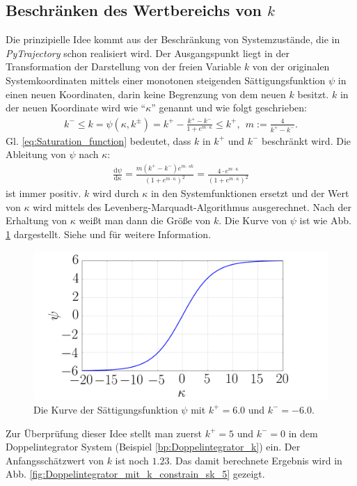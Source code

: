 \subsection{Beschränken des Wertbereichs von $k$}
\label{Beschränken_des_Wertbereichs_von_k}
Die prinzipielle Idee kommt aus der Beschränkung von Systemzustände, die in \emph{PyTrajectory} schon realisiert wird. Der Ausgangspunkt liegt in der Transformation der Darstellung von der freien Variable $k$ von der originalen Systemkoordinaten mittels einer monotonen steigenden Sättigungsfunktion $\psi$ in einen neuen Koordinaten, darin keine Begrenzung von dem neuen $k$ besitzt. $k$ in der neuen Koordinate wird wie ``$\kappa$'' genannt und wie folgt geschrieben:
\begin{eqnarray}
k^{-}\leq k = \psi (\kappa,k^{\pm}) = k^{+}- \frac{k^{+}-k^{-}}{1+e^{m\cdot \kappa}}\leq k^{+},~~m := \frac{4}{k^{+}-k^{-}}.
\label{eq:Saturation_function}
\end{eqnarray}
Gl. \eqref{eq:Saturation_function} bedeutet, dass $k$ in $k^{+}$ und $k^{-}$ beschränkt wird. Die Ableitung von $\psi$ nach $\kappa$:
\begin{eqnarray}
\frac{\mathrm{d} \psi}{\mathrm{d}\kappa} = \frac{m(k^{+}-k^{-})e^{m\cdot sk}}{(1+e^{m\cdot \kappa})^{2}} = \frac{4\cdot e^{m\cdot \kappa}}{(1+e^{m\cdot \kappa})^{2}}
\label{eq:Saturation_function_diff}
\end{eqnarray}
ist immer positiv. $k$ wird durch $\kappa$ in den Systemfunktionen ersetzt und der Wert von $\kappa$ wird mittels des Levenberg-Marquadt-Algorithmus ausgerechnet. Nach der Erhaltung von $\kappa$ weißt man dann die Größe von $k$. Die Kurve von $\psi$ ist wie Abb. \ref{fig:psi_plot} dargestellt. Siehe \cite{graichen2006inversionsbasierter} und \cite{kunze2016pytrajectory} für weitere Information.
\begin{figure}[!h]
	\centering
	\includegraphics[width=0.7\linewidth]{bild/30_32/psi.png}%
	\caption{Die Kurve der Sättigungsfunktion $\psi$ mit $k^{+}=6.0$ und $k^{-}=-6.0$.}
	\label{fig:psi_plot}
\end{figure}
Zur Überprüfung dieser Idee stellt man zuerst $k^{+}=5$ und $k^{-}=0$ in dem Doppelintegrator System (Beispiel \ref{bp:Doppelintegrator_k}) ein. Der Anfangsschätzwert von $k$ ist noch $1.23$. Das damit berechnete Ergebnis wird in Abb. \ref{fig:Doppelintegrator_mit_k_constrain_sk_5} gezeigt.

